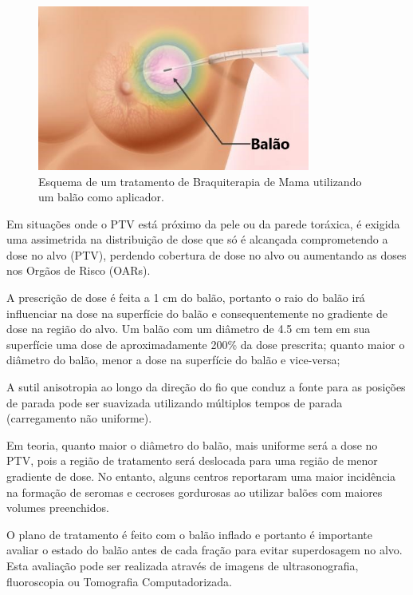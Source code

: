 \documentclass[11pt,a4paper]{article}
\begin{document}
			\begin{figure}[h]
				\centering
				\includegraphics[width=0.8\textwidth]{Imagens/esquemaBalaoMama.jpg}
				\caption{Esquema de um tratamento de Braquiterapia de Mama utilizando um balão como aplicador.}
				\label{img:esquemaBalao}
			\end{figure}


			Em situações onde o PTV está próximo da pele ou da parede toráxica, é exigida uma assimetrida na distribuição de dose que só é alcançada comprometendo a dose no alvo (PTV), perdendo cobertura de dose no alvo ou aumentando as doses nos Orgãos de Risco (OARs).


			A prescrição de dose é feita a 1 cm do balão, portanto o raio do balão irá influenciar na dose na superfície do balão e consequentemente no gradiente de dose na região do alvo. Um balão com um diâmetro de 4.5 cm tem em sua superfície uma dose de aproximadamente 200\% da dose prescrita; quanto maior o diâmetro do balão, menor a dose na superfície do balão e vice-versa;

			A sutil anisotropia ao longo da direção do fio que conduz a fonte para as posições de parada pode ser suavizada utilizando múltiplos tempos de parada (carregamento não uniforme). 

			Em teoria, quanto maior o diâmetro do balão, mais uniforme será a dose no PTV, pois a região de tratamento será deslocada para uma região de menor gradiente de dose. No entanto, alguns centros reportaram uma maior incidência na formação de seromas e cecroses gordurosas ao utilizar balões com maiores volumes preenchidos.

			O plano de tratamento é feito com o balão inflado e portanto é importante avaliar o estado do balão antes de cada fração para evitar superdosagem no alvo. Esta avaliação pode ser realizada através de imagens de ultrasonografia, fluoroscopia ou Tomografia Computadorizada.
\end{document}

